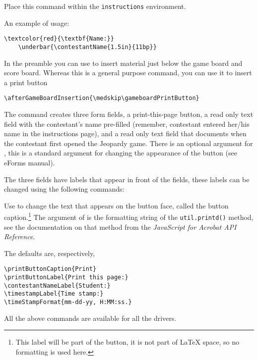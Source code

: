 \documentclass{article}
\begin{document}
\CmdLoc Place this command within the \texttt{instructions} environment.

An example of usage:
\begin{Verbatim}[xleftmargin=\amtIndent,fontsize=\small]
\textcolor{red}{\textbf{Name:}}
    \underbar{\contestantName{1.5in}{11bp}}
\end{Verbatim}
In the preamble you can use  to insert material just below
the game board and score board.  Whereas this is a general purpose command, you can
use it to insert a print button
\begin{Verbatim}[xleftmargin=\amtIndent]
  \afterGameBoardInsertion{\medskip\gameboardPrintButton}
\end{Verbatim}
The command  creates three form fields, a
print-this-page button, a read only text field with the contestant's
name pre-filled (remember, contestant entered her/his name in the
instructions page), and a read only text field that documents when
the contestant first opened the Jeopardy game. There is an optional
argument for , this is a standard argument
for changing the appearance of the button (see eForms manual).

The three fields have labels that appear in front of the fields, these labels
can be changed using the following commands:
\bVerb{}%
\begin{dCmd}[commandchars=!()]{\bxSize}
\end{dCmd}
\eVerb
Use  to change the text that appears on the
button face, called the button caption.\footnote{This label will be part of the button, it is not part of
{\LaTeX} space, so no formatting is used here.} The argument of
 is the formatting string of the
\texttt{util.printd()} method, see the documentation on that method
from the \emph{JavaScript for Acrobat API Reference}.

The defaults are, respectively,
\begin{Verbatim}[xleftmargin=\amtIndent]
\printButtonCaption{Print}
\printButtonLabel{Print this page:}
\contestantNameLabel{Student:}
\timestampLabel{Time stamp:}
\timeStampFormat{mm-dd-yy, H:MM:ss.}
\end{Verbatim}
All the above commands are available for all the drivers.
\end{document}
